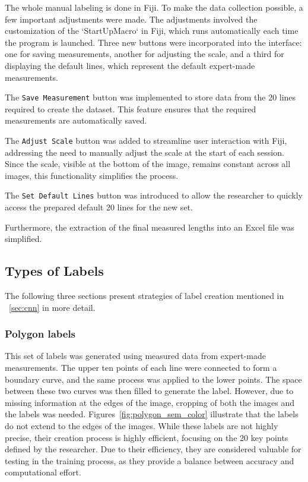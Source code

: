 The whole manual labeling is done in Fiji. To make the data collection possible, a few important adjustments were made. The adjustments involved the customization of the `StartUpMacro` in Fiji, which runs automatically each time the program is launched. Three new buttons were incorporated into the interface: one for saving measurements, another for adjusting the scale, and a third for displaying the default lines, which represent the default expert-made measurements.

The \texttt{Save Measurement} button was implemented to store data from the 20 lines required to create the dataset. This feature ensures that the required measurements are automatically saved.

The \texttt{Adjust Scale} button was added to streamline user interaction with Fiji, addressing the need to manually adjust the scale at the start of each session. Since the scale, visible at the bottom of the image, remains constant across all images, this functionality simplifies the process.

The \texttt{Set Default Lines} button was introduced to allow the researcher to quickly access the prepared default 20 lines for the new set.

Furthermore, the extraction of the final measured lengths into an Excel file was simplified.

\subsection{Types of Labels}\label{sec:masks}


The following three sections present strategies of label creation mentioned in ~\ref{sec:cnn} in more detail.



\subsubsection{Polygon labels}

This set of labels was generated using measured data from expert-made measurements. The upper ten points of each line were connected to form a boundary curve, and the same process was applied to the lower points. The space between these two curves was then filled to generate the label. However, due to missing information at the edges of the image, cropping of both the images and the labels was needed. Figures~\ref{fig:polygon_sem_color} illustrate that the labels do not extend to the edges of the images. While these labels are not highly precise, their creation process is highly efficient, focusing on the 20 key points defined by the researcher. Due to their efficiency, they are considered valuable for testing in the training process, as they provide a balance between accuracy and computational effort.



